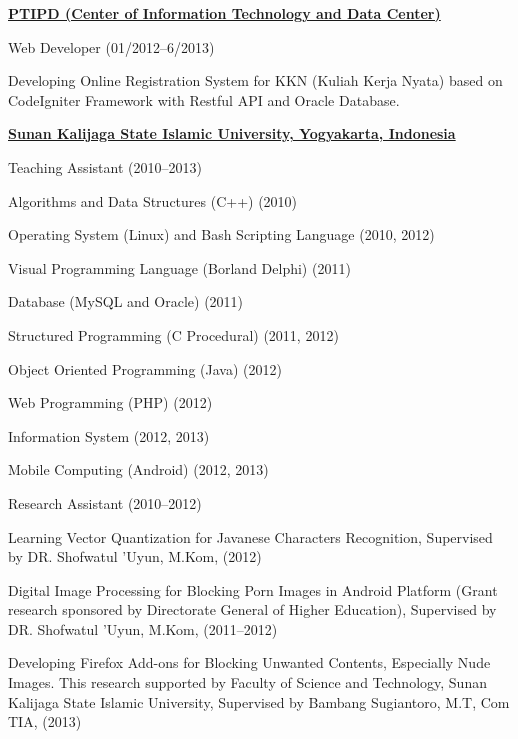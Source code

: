 \documentclass[10pt]{article}
\begin{document}
\vspace{.1in}



\href{http://it.uin-suka.ac.id/}{\textbf{PTIPD (Center of Information Technology and Data Center)  }}
\begin{outerlist}
	\item[] Web Developer \hfill(01/2012--6/2013)
	\begin{innerlist}
		\item Developing Online Registration System for KKN (Kuliah Kerja Nyata) based on CodeIgniter Framework with Restful API and Oracle Database.
	\end{innerlist}
\end{outerlist}

\vspace{.1in}
\href{http://uin-suka.ac.id/}{\textbf{Sunan Kalijaga State Islamic University, Yogyakarta, Indonesia}}
\begin{outerlist}
	\item[] Teaching Assistant \hfill(2010--2013)
		\begin{innerlist}
		\item Algorithms and Data Structures (C++) \hfill(2010) 
		\item Operating System (Linux) and Bash Scripting Language \hfill(2010, 2012) 
		\item Visual Programming Language (Borland Delphi) \hfill(2011) 
		\item Database (MySQL and Oracle) \hfill(2011) 
		\item Structured Programming (C Procedural) \hfill(2011, 2012) 
		\item Object Oriented Programming (Java) \hfill(2012) 
		\item Web Programming (PHP) \hfill(2012) 
		\item Information System \hfill(2012, 2013) 
		\item Mobile Computing (Android) \hfill(2012, 2013) 
		\end{innerlist}
		
	\item[] Research Assistant \hfill(2010--2012)
		\begin{innerlist}
			\item Learning Vector Quantization for Javanese Characters Recognition, Supervised by DR. Shofwatul 'Uyun, M.Kom, \hfill(2012)
			\item Digital Image Processing for Blocking Porn Images in Android Platform (Grant research sponsored by Directorate General of Higher Education), Supervised by DR. Shofwatul 'Uyun, M.Kom, \hfill(2011--2012) 
			\item Developing Firefox Add-ons for Blocking Unwanted Contents, Especially Nude Images. This research supported by Faculty of Science and Technology, Sunan Kalijaga State Islamic University, Supervised by Bambang Sugiantoro, M.T, Com TIA, \hfill(2013)
			
		\end{innerlist}
\end{outerlist}
\end{document}
